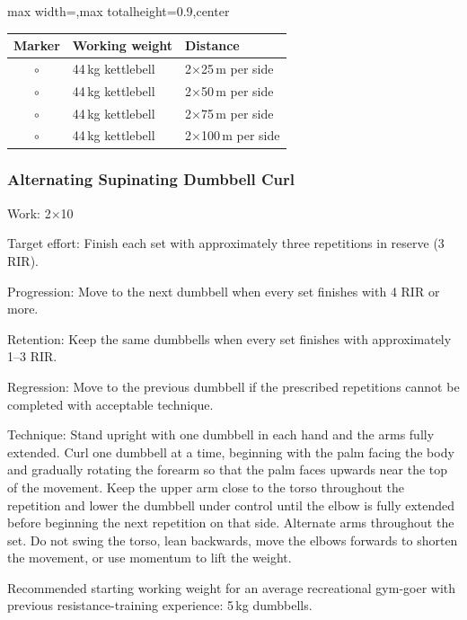 \documentclass[11pt,a4paper]{article}
\newcommand{\tablearraystretch}{1.15}
\begin{document}
\begin{center}
\renewcommand{\arraystretch}{\tablearraystretch}
\begin{adjustbox}{max width=\linewidth,max totalheight=0.9\textheight,center}
\begin{tabular}{cll}
\toprule
Marker & Working weight & Distance \\
\midrule
$\circ$ & 44\,kg kettlebell & 2$\times$25\,m per side \\
$\circ$ & 44\,kg kettlebell & 2$\times$50\,m per side \\
$\circ$ & 44\,kg kettlebell & 2$\times$75\,m per side \\
$\circ$ & 44\,kg kettlebell & 2$\times$100\,m per side \\
\bottomrule
\end{tabular}
\end{adjustbox}
\renewcommand{\arraystretch}{1}
\end{center}

\newpage
\subsubsection{Alternating Supinating Dumbbell Curl}

Work: 2$\times$10

Target effort: Finish each set with approximately three repetitions in reserve (3 RIR).

Progression: Move to the next dumbbell when every set finishes with 4 RIR or more.

Retention: Keep the same dumbbells when every set finishes with approximately 1--3 RIR.

Regression: Move to the previous dumbbell if the prescribed repetitions cannot be completed with acceptable technique.

Technique: Stand upright with one dumbbell in each hand and the arms fully extended. Curl one dumbbell at a time, beginning with the palm facing the body and gradually rotating the forearm so that the palm faces upwards near the top of the movement. Keep the upper arm close to the torso throughout the repetition and lower the dumbbell under control until the elbow is fully extended before beginning the next repetition on that side. Alternate arms throughout the set. Do not swing the torso, lean backwards, move the elbows forwards to shorten the movement, or use momentum to lift the weight.

Recommended starting working weight for an average recreational gym-goer with previous resistance-training experience: 5\,kg dumbbells.
\end{document}
